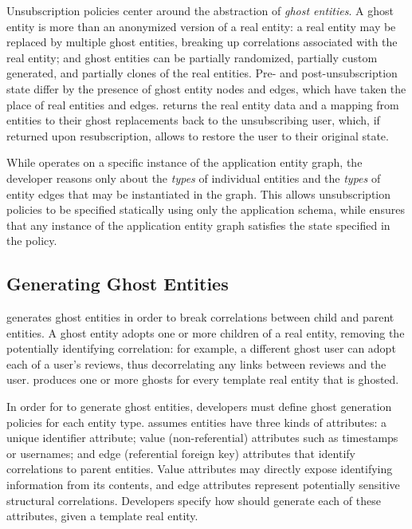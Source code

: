 Unsubscription policies center around the abstraction of \emph{ghost entities}. A ghost entity is
more than an anonymized version of a real entity: a real entity may be replaced by multiple ghost
entities, breaking up correlations associated with the real entity; and ghost entities can be
partially randomized, partially custom generated, and partially clones of the real entities. 
Pre- and post-unsubscription state differ by the presence of ghost entity nodes and edges, which
have taken the place of real entities and edges. \sys returns the real entity data and a mapping
from entities to their ghost replacements back to the unsubscribing user, which, if returned upon
resubscription, allows \sys to restore the user to their original state.

While \sys operates on a specific instance of the application entity graph, the developer reasons
only about the \emph{types} of individual entities and the \emph{types} of entity edges that may be
instantiated in the graph. This allows unsubscription policies to be specified statically using only
the application schema, while \sys ensures that any instance of the application entity graph
satisfies the state specified in the policy.

\subsection{Generating Ghost Entities}
\label{sec:ghosting}

\sys generates ghost entities in order to break correlations between child and parent entities.  A
ghost entity adopts one or more children of a real entity, removing the potentially identifying
correlation: for example, a different ghost user can adopt each of a user's reviews, thus
decorrelating any links between reviews and the user. \sys produces one or more ghosts for every
template real entity that is ghosted. 

In order for \sys to generate ghost entities, developers must define ghost generation policies for
each entity type.  \sys assumes entities have three kinds of attributes: a unique identifier
attribute; value (non-referential) attributes such as timestamps or usernames; and edge (referential
foreign key) attributes that identify correlations to parent entities.  Value attributes may
directly expose identifying information from its contents, and edge attributes represent potentially
sensitive structural correlations.  Developers specify how \sys should generate each of these
attributes, given a template real entity.

